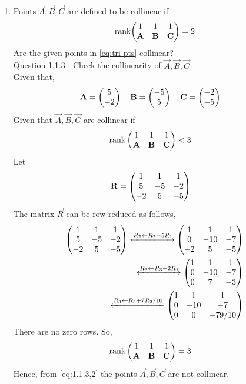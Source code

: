 \documentclass[11pt]{book}
\begin{document}
\begin{enumerate}[label=\thesection.\arabic*.,ref=\thesection.\theenumi]
\item   Points $\vec{A}, \vec{B}, \vec{C}$ are defined to be collinear if 
		\begin{align}
			\text{rank}{\ensuremath{\begin{pmatrix}1 & 1 & 1 \\ \mathbf{A}& \mathbf{B}&\mathbf{C}\end{pmatrix}}} = 2
		\end{align}
Are the given points in
			\eqref{eq:tri-pts}
collinear?\\
Question 1.1.3 : Check the collinearity of $\vec{A},\vec{B},\vec{C}$ \\ 
\solution 
Given that,
\begin{align}
    \mathbf{A} = \begin{pmatrix}5\\-2\end{pmatrix}
    \quad
    \mathbf{B} &= \begin{pmatrix}-5\\5\end{pmatrix}
    \quad
    \mathbf{C} = \begin{pmatrix}-2\\-5\end{pmatrix}
\end{align}
Given that $\vec{A},\vec{B},\vec{C}$ are collinear if
\begin{align}
    \text{rank}\myvec{
    1 & 1 &1\\
    \vec{A} & \vec{B} & \vec{C} \\
    } &< 3 
    \label{eq:1.1.3,2}
\end{align} 
Let
\begin{align}
    \mathbf{R}&=\begin{pmatrix}
    1 & 1 & 1
    \\
    5& -5 & -2
    \\
    -2 & 5 & -5
    \end{pmatrix} 
\end{align} 
The matrix $\vec{R}$ can be row reduced as follows,
\begin{align}
    \label{eq:matthrowoperations}
    \myvec{
    1 & 1 & 1
    \\
    5 & -5 & -2
    \\
    -2 & 5 & -5
    }
     \xleftrightarrow[]{R_2 \leftarrow R_2-5R_1}
    \myvec{
    1 & 1 & 1
    \\
    0 & -10 & -7
    \\
    -2 & 5 & -5
    }
    \\
     \xleftrightarrow[]{R_3\leftarrow R_3+2R_1}
    \myvec{
    1 & 1 & 1
    \\
    0 & -10 & -7
    \\
    0 & 7 & -3
    }
    \\
    \xleftarrow[]{R_3\leftarrow R_3+7R_2/10}
    \myvec{
    1 & 1 & 1
    \\
    0 & -10 & -7
    \\
    0 & 0 & -79/10
    }
\end{align}
There are no zero rows. So,
\begin{align}
    \text{rank}\begin{pmatrix}
    1 & 1 & 1\\
    \mathbf{A} & \mathbf{B} & \mathbf{C} \\
    \end{pmatrix} &= 3 
\end{align}  
Hence, from \eqref{eq:1.1.3,2} the points $\vec{A},\vec{B},\vec{C}$ are not collinear. 


\end{enumerate}
\end{document}
